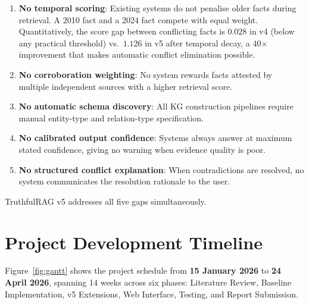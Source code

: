 \begin{enumerate}
    \item \textbf{No temporal scoring}: Existing systems do not penalise older
    facts during retrieval. A 2010 fact and a 2024 fact compete with equal weight.
    Quantitatively, the score gap between conflicting facts is $0.028$ in v4
    (below any practical threshold) vs.\ $1.126$ in v5 after temporal decay,
    a 40$\times$ improvement that makes automatic conflict elimination possible.
    \item \textbf{No corroboration weighting}: No system rewards facts attested
    by multiple independent sources with a higher retrieval score.
    \item \textbf{No automatic schema discovery}: All KG construction pipelines
    require manual entity-type and relation-type specification.
    \item \textbf{No calibrated output confidence}: Systems always answer at
    maximum stated confidence, giving no warning when evidence quality is poor.
    \item \textbf{No structured conflict explanation}: When contradictions are
    resolved, no system communicates the resolution rationale to the user.
\end{enumerate}

TruthfulRAG v5 addresses all five gaps simultaneously.

\section{Project Development Timeline}

Figure~\ref{fig:gantt} shows the project schedule from \textbf{15 January 2026}
to \textbf{24 April 2026}, spanning 14 weeks across six phases: Literature Review,
Baseline Implementation, v5 Extensions, Web Interface, Testing, and Report Submission.

